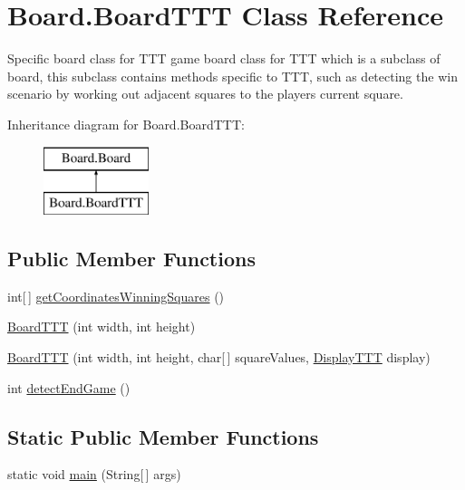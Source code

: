\hypertarget{class_board_1_1_board_t_t_t}{}\section{Board.\+Board\+T\+T\+T Class Reference}
\label{class_board_1_1_board_t_t_t}


Specific board class for T\+T\+T game board class for T\+T\+T which is a subclass of board, this subclass contains methods specific to T\+T\+T, such as detecting the win scenario by working out adjacent squares to the players current square.  


Inheritance diagram for Board.\+Board\+T\+T\+T\+:\begin{figure}[H]
\begin{center}
\leavevmode
\includegraphics[height=2.000000cm]{class_board_1_1_board_t_t_t}
\end{center}
\end{figure}
\subsection*{Public Member Functions}
\begin{DoxyCompactItemize}
\item 
int\mbox{[}$\,$\mbox{]} \hyperlink{class_board_1_1_board_t_t_t_a14ae6a700a6f83643afd3da120c1ee26}{get\+Coordinates\+Winning\+Squares} ()
\item 
\hyperlink{class_board_1_1_board_t_t_t_ac79a9beb148634225ef350d3ca0628ad}{Board\+T\+T\+T} (int width, int height)
\item 
\hyperlink{class_board_1_1_board_t_t_t_a3a5fc9e11157089f888727ba696fc2e4}{Board\+T\+T\+T} (int width, int height, char\mbox{[}$\,$\mbox{]} square\+Values, \hyperlink{class_display_1_1_display_t_t_t}{Display\+T\+T\+T} display)
\item 
int \hyperlink{class_board_1_1_board_t_t_t_a08f36da4210111d8f129be28a550334e}{detect\+End\+Game} ()
\end{DoxyCompactItemize}
\subsection*{Static Public Member Functions}
\begin{DoxyCompactItemize}
\item 
static void \hyperlink{class_board_1_1_board_t_t_t_a1b62648f4ca1d4a074767027b9c8eec0}{main} (String\mbox{[}$\,$\mbox{]} args)
\end{DoxyCompactItemize}
